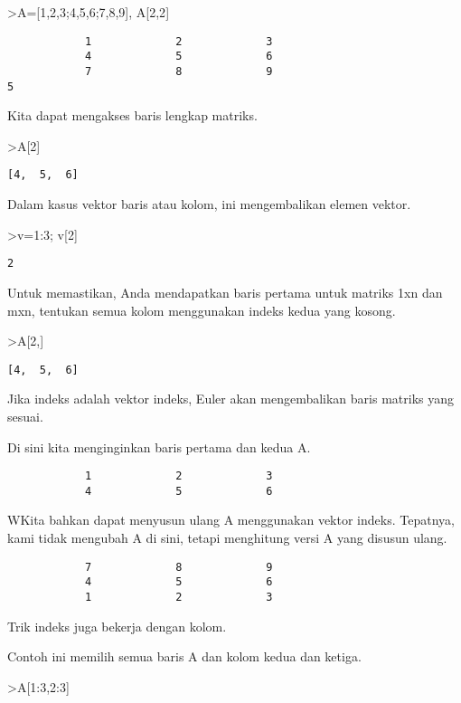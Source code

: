 \documentclass[
]{book}
\begin{document}
\textgreater A={[}1,2,3;4,5,6;7,8,9{]}, A{[}2,2{]}

\begin{verbatim}
            1             2             3 
            4             5             6 
            7             8             9 
5
\end{verbatim}

Kita dapat mengakses baris lengkap matriks.

\textgreater A{[}2{]}

\begin{verbatim}
[4,  5,  6]
\end{verbatim}

Dalam kasus vektor baris atau kolom, ini mengembalikan elemen vektor.

\textgreater v=1:3; v{[}2{]}

\begin{verbatim}
2
\end{verbatim}

Untuk memastikan, Anda mendapatkan baris pertama untuk matriks 1xn dan mxn, tentukan semua kolom menggunakan indeks kedua yang kosong.

\textgreater A{[}2,{]}

\begin{verbatim}
[4,  5,  6]
\end{verbatim}

Jika indeks adalah vektor indeks, Euler akan mengembalikan baris matriks yang sesuai.

Di sini kita menginginkan baris pertama dan kedua A.

\begin{verbatim}
            1             2             3 
            4             5             6 
\end{verbatim}

WKita bahkan dapat menyusun ulang A menggunakan vektor indeks. Tepatnya, kami tidak mengubah A di sini, tetapi menghitung versi A yang disusun ulang.

\begin{verbatim}
            7             8             9 
            4             5             6 
            1             2             3 
\end{verbatim}

Trik indeks juga bekerja dengan kolom.

Contoh ini memilih semua baris A dan kolom kedua dan ketiga.

\textgreater A{[}1:3,2:3{]}
\end{document}
